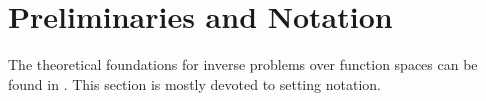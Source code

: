 \documentclass{amsart}
\numberwithin{equation}{section}
\begin{document}

\section{Preliminaries and Notation}\label{section:prelim}

The theoretical foundations for inverse problems over function spaces
can be found in \cite{Stuart10}. This section is mostly devoted to
setting notation. 
\end{document}
